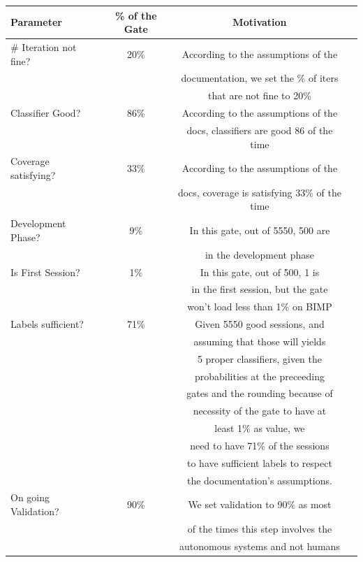 \begin{table}[H]
    \centering
    \begin{tabularx}{\textwidth}{|X|c|c|c|}
    \hline
    \textbf{Parameter} & \textbf{\% of the Gate} & \textbf{Motivation} \\
    \hline
     \# Iteration not fine? & 20\% & According to the assumptions of the \\
     & & documentation, we set the \% of iters \\
     & & that are not fine to 20\% \\
    \hline
    Classifier Good? & 86\% & According to the assumptions of the \\
     & & docs, classifiers are good 86 of the time \\
    \hline
    Coverage satisfying? & 33\% & According to the assumptions of the \\
     & & docs, coverage is satisfying 33\% of the time \\
    \hline
    Development Phase? & 9\% & In this gate, out of 5550, 500 are \\
     & & in the development phase \\
    \hline
    Is First Session? & 1\% & In this gate, out of 500, 1 is 
    \\ & & in the first session, but the gate
    \\ & & won't load less than 1\% on BIMP 
    \\
    \hline
    Labels sufficient? & 71\% & Given 5550 good sessions, and 
    \\ & & assuming that those will yields
    \\ & & 5 proper classifiers, given the 
    \\ & & probabilities at the preceeding 
    \\ & & gates and the rounding because of 
    \\ & & necessity of the gate to have at 
    \\ & & least 1\% as value, we 
    \\ & & need to have 71\% of the sessions 
    \\ & & to have sufficient labels to respect 
    \\ & & the documentation's assumptions.
    \\
    \hline
    On going Validation? & 90\% & We set validation to 90\% as most
    \\ & & of the times this step involves the
    \\ & & autonomous systems and not humans \\

\end{tabularx}
\end{table}
